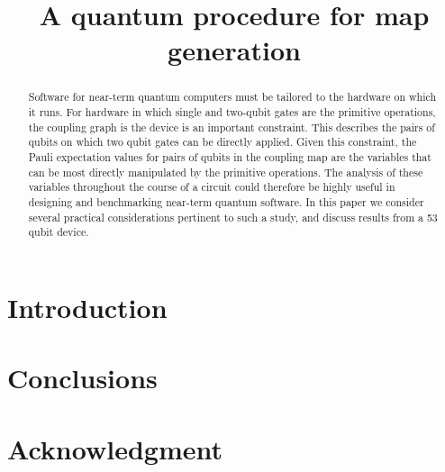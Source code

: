 \documentclass[conference]{IEEEtran}
\begin{document}
\title{A quantum procedure for map generation}



\author{
}


\maketitle

\begin{abstract}


Software for near-term quantum computers must be tailored to the hardware on which it runs. For hardware in which single and two-qubit gates are the primitive operations, the coupling graph is the device is an important constraint. This describes the pairs of qubits on which two qubit gates can be directly applied. Given this constraint, the Pauli expectation values for pairs of qubits in the coupling map are the variables that can be most directly manipulated by the primitive operations. The analysis of these variables throughout the course of a circuit could therefore be highly useful in designing and benchmarking near-term quantum software. In this paper we consider several practical considerations pertinent to such a study, and discuss results from a 53 qubit device.





\end{abstract}

\begin{IEEEkeywords}
\end{IEEEkeywords}



\section{Introduction}



\section{Conclusions}



\section*{Acknowledgment}





\end{document}

